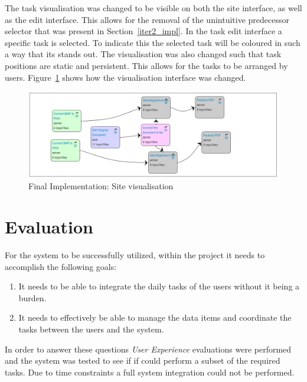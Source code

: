 \documentclass[12pt,a4paper]{report}
\begin{document}
The task visualisation was changed to be visible on both the site interface, as well as the 
edit interface. This allows for the removal of the unintuitive predecessor selector that
was present in Section~\ref{iter2_impl}. In the task edit interface a
specific task is selected. To indicate this the selected task will be 
coloured in such a way that its stands out. The visualisation was also
changed such that task positions are static and persistent. This allows
for the tasks to be arranged by users. Figure~\ref{final:visual} shows
how the visualisation interface was changed.


\begin{figure}[!h]
    \begin{center}
        \includegraphics[scale=0.45]{figures/final-visual.png}
    \end{center}
    \caption{Final Implementation: Site visualisation}
    \label{final:visual}
\end{figure}

\chapter{Evaluation}

For the system to be successfully utilized, within the project
it needs to accomplish the following goals: 
\begin{enumerate}
\item It needs to be able to integrate the daily tasks of the users
      without it being a burden. 
\item It needs to effectively be able to manage the data items and
      coordinate the tasks between the users and the system. 
\end{enumerate}

In order to answer these questions \emph{User Experience} evaluations
were performed and the system was tested to see if if could perform
a subset of the required tasks. Due to time constraints a full 
system integration could not be performed. 
\end{document}
